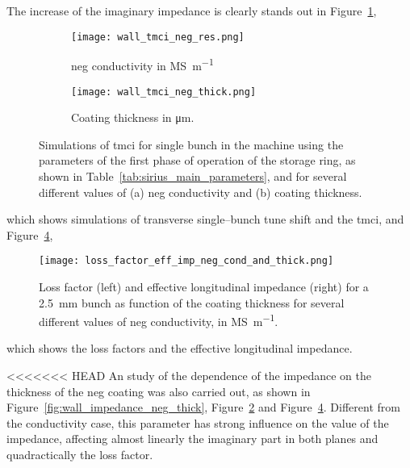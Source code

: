     The increase of the imaginary impedance is clearly stands out in Figure~\ref{fig:wall_tmci_neg_res},
    \begin{figure}
        \centering
        \begin{subfigure}[c]{0.49\textwidth}
            \texttt{[image: wall\_tmci\_neg\_res.png]}
            \caption{\gls{neg} conductivity in \si{\mega\siemens\per\meter}}
            \label{fig:wall_tmci_neg_res}
            \end{subfigure}\hfill
            \begin{subfigure}[c]{0.49\textwidth}
                \texttt{[image: wall\_tmci\_neg\_thick.png]}
                \caption{Coating thickness in \si{\micro\meter}.}
                \label{fig:wall_tmci_neg_thick}
            \end{subfigure}
            \caption[Effect of NEG on TMCI]{Simulations of \gls{tmci} for single bunch in the machine using the parameters of the first phase of operation of the storage ring, as shown in Table~\ref{tab:sirius_main_parameters}, and for several different values of (a) \gls{neg} conductivity and (b) coating thickness.}
            \label{fig:wall_tmci_neg}
        \end{figure}
    which shows simulations of transverse single--bunch tune shift and the \gls{tmci}, and Figure~\ref{fig:wall_loss_facttor_eff_imp_cond_thick},
    \begin{figure}
        \centering
        \texttt{[image: loss\_factor\_eff\_imp\_neg\_cond\_and\_thick.png]}
        \caption[Effect of NEG on loss factor and effective longitudinal impedance]{Loss factor (left) and effective longitudinal impedance (right) for a \SI{2.5}{\milli\meter} bunch as function of the coating thickness for several different values of \gls{neg} conductivity, in \si{\mega\siemens\per\meter}.}
        \label{fig:wall_loss_facttor_eff_imp_cond_thick}
    \end{figure}
    which shows the loss factors and the effective longitudinal impedance.

<<<<<<< HEAD
    An study of the dependence of the impedance on the thickness of the \gls{neg} coating was also carried out, as shown in Figure~\ref{fig:wall_impedance_neg_thick}, Figure~\ref{fig:wall_tmci_neg_thick} and Figure~\ref{fig:wall_loss_facttor_eff_imp_cond_thick}. Different from the conductivity case, this parameter has strong influence on the value of the impedance, affecting almost linearly the imaginary part in both planes and quadractically the loss factor.

